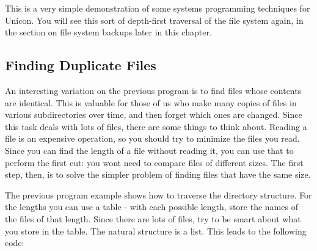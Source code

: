 This is a very simple demonstration of some systems programming
techniques for Unicon. You will see this sort of depth-first traversal
of the file system again, in the section on file system backups later
in this chapter.

\subsection[Finding Duplicate Files]{Finding Duplicate Files}
An interesting variation on the previous program is to find files whose
contents are identical. This is valuable for those of us who make many
copies of files in various subdirectories over time, and then forget
which ones are changed. Since this task deals with lots of files, there
are some things to think about. Reading a file is an expensive
operation, so you should try to minimize the files you read. Since you
can find the length of a file without reading it, you can use that to
perform the first cut: you won{\textquotesingle}t need to compare files
of different sizes. The first step, then, is to solve the simpler
problem of finding files that have the same size. 

The previous program example shows how to traverse the directory
structure. For the lengths you can use a table - with each possible
length, store the names of the files of that length. Since there are
lots of files, try to be smart about what you store in the table. The
natural structure is a list. This leads to the following code: 


